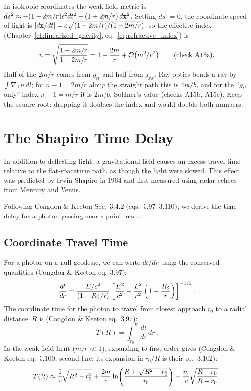 \begin{annotation}
In isotropic coordinates the weak-field metric is
$ds^2 \approx -(1 - 2m/r)c^2dt^2 + (1 + 2m/r)\,d\mathbf{x}^2$.
Setting $ds^2 = 0$, the coordinate speed of light is
$|d\mathbf{x}/dt| = c\sqrt{(1-2m/r)/(1+2m/r)}$, so the effective
index (Chapter~\ref{ch:linearized_gravity}, eq.~\eqref{eq:refractive_index}) is
\[
    n = \sqrt{\frac{1 + 2m/r}{1 - 2m/r}} = 1 + \frac{2m}{r} + \mathcal{O}\!\left(m^2/r^2\right)
    \qquad (\text{check A15a}).
\]
Half of the $2m/r$ comes from $g_{tt}$ and half from $g_{xx}$.  Ray optics
bends a ray by $\int \nabla_\perp n\, dl$; for $n - 1 = 2m/r$ along the
straight path this is $4m/b$, and for the ``$g_{tt}$ only'' index
$n - 1 = m/r$ it is $2m/b$, Soldner's value (checks A15b, A15c).  Keep the
square root: dropping it doubles the index and would double both numbers.
\end{annotation}

\section{The Shapiro Time Delay}
\label{sec:shapiro_delay}

In addition to deflecting light, a gravitational field causes an excess
travel time relative to the flat-spacetime path, as though the light were
slowed.  This effect was predicted by Irwin Shapiro in 1964
and first measured using radar echoes from Mercury and Venus.

Following Congdon \& Keeton Sec.~3.4.2 (eqs.~3.97--3.110), we derive the
time delay for a photon passing near a point mass.

\subsection{Coordinate Travel Time}
\label{sec:coordinate_travel_time}

For a photon on a null geodesic, we can write $dt/dr$ using the
conserved quantities (Congdon \& Keeton eq.~3.97):
\begin{equation}
    \frac{dt}{dr} = \frac{E / c^2}{(1 - R_{\mathrm{S}}/r)}
    \left[\frac{E^2}{c^2}
    - \frac{L^2}{r^2}\left(1 - \frac{R_{\mathrm{S}}}{r}\right)
    \right]^{-1/2} .
    \label{eq:dt_dr}
\end{equation}
The coordinate time for the photon to travel from closest approach $r_0$ to
a radial distance~$R$ is (Congdon \& Keeton eq.~3.97):
\begin{equation}
    T(R) = \int_{r_0}^{R} \frac{dt}{dr}\, dr \,.
    \label{eq:travel_time}
\end{equation}
In the weak-field limit ($m/r \ll 1$), expanding to first order gives
(Congdon \& Keeton eq.~3.100, second line; its expansion in $r_0/R$ is their eq.~3.102):
\begin{equation}
    T(R) \approx \frac{1}{c}\sqrt{R^2 - r_0^2}
    + \frac{2m}{c}\ln\!\left(
    \frac{R + \sqrt{R^2 - r_0^2}}{r_0}\right)
    + \frac{m}{c}\sqrt{\frac{R - r_0}{R + r_0}} \,.
    \label{eq:travel_time_expanded}
\end{equation}


